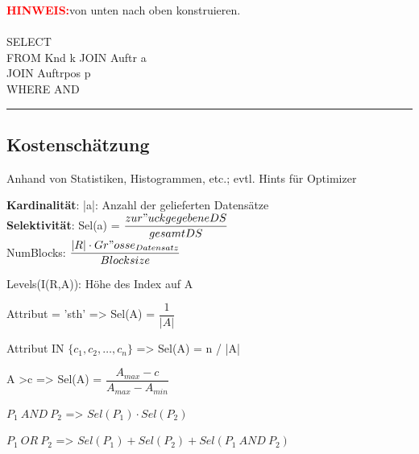 \begin{minipage}{0.25\textwidth}
\textbf{\textcolor{red}{HINWEIS:}}von unten nach oben konstruieren.\\\\
SELECT  \\
FROM Knd k JOIN Auftr a  \\
JOIN Auftrpos p  \\
WHERE  AND\\
\rule{2em}{0em}
\end{minipage}
\begin{minipage}{0.25\textwidth}
\end{minipage}



\subsection{Kostenschätzung}
Anhand von Statistiken, Histogrammen, etc.; evtl. Hints für Optimizer

\textbf{Kardinalität}: |a|: Anzahl der gelieferten Datensätze \\
\textbf{Selektivität}: 
Sel(a) = $\dfrac{zur"uckgegebene DS}{gesamt DS}$\\
NumBlocks: $\dfrac{|R|\cdot Gr"osse_{Datensatz}}{Blocksize}$

Levels(I(R,A)): Höhe des Index auf A


Attribut = 'sth' => Sel(A) = $\dfrac{1}{|A|}$

Attribut IN $\{c_1,c_2, \dots , c_n\}$ => Sel(A) = n / |A|

A >c => Sel(A) = $\dfrac{A_{max} -c }{A_{max} - A_{min}}$

$P_1~AND~P_2$ => $Sel(P_1) \cdot Sel(P_2)$

$P_1~OR~P_2$ => $Sel(P_1) + Sel(P_2) + Sel(P_1~AND~P_2)$



